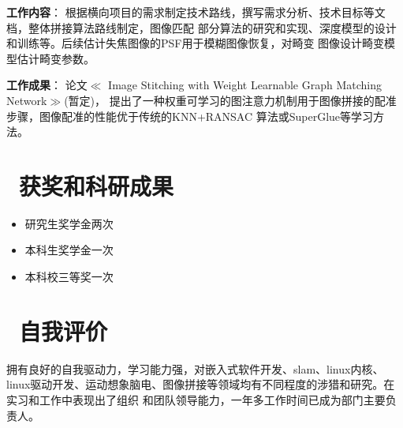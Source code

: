 \documentclass{resume}
\begin{document}
\textcolor[RGB]{80,100,190}{\textbf{工作内容}}：
根据横向项目的需求制定技术路线，撰写需求分析、技术目标等文档，整体拼接算法路线制定，图像匹配
部分算法的研究和实现、深度模型的设计和训练等。后续估计失焦图像的PSF用于模糊图像恢复，对畸变
图像设计畸变模型估计畸变参数。

\textcolor[RGB]{80,100,190}{\textbf{工作成果}}：
论文$\ll$ Image Stitching with Weight Learnable Graph Matching Network$\gg$(暂定)，
提出了一种权重可学习的图注意力机制用于图像拼接的配准步骤，图像配准的性能优于传统的KNN+RANSAC
算法或SuperGlue等学习方法。
\\

\section{\textcolor[RGB]{50,50,190}{\faPaperPlane\ 获奖和科研成果}}
\begin{itemize}
  \item 研究生奖学金两次
  \item 本科生奖学金一次
  \item 本科校三等奖一次
\end{itemize}

\section{\textcolor[RGB]{50,50,190}{\faChild\ 自我评价}}
拥有良好的自我驱动力，学习能力强，对嵌入式软件开发、slam、linux内核、
linux驱动开发、运动想象脑电、图像拼接等领域均有不同程度的涉猎和研究。在实习和工作中表现出了组织
和团队领导能力，一年多工作时间已成为部门主要负责人。



%
%
\end{document}
